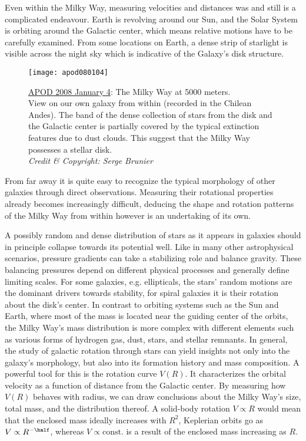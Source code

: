 
Even within the Milky Way, measuring velocities and distances was and still is a
complicated endeavour.  Earth is revolving around our Sun, and the Solar System
is orbiting around the Galactic center, which means relative motions have to be
carefully examined.  From some locations on Earth, a dense strip of starlight is
visible across the night sky which is indicative of the Galaxy's disk structure.

\begin{figure}[h]
    \texttt{[image: apod080104]}
    \caption[The Milky Way: APOD 2008 January
    4]{\href{https://apod.nasa.gov/apod/ap080104.html}{APOD 2008 January 4}: The
    Milky Way at 5000 meters.\\
    View on our own galaxy from within (recorded in the Chilean Andes).  The
    band of the dense collection of stars from the disk and the Galactic center
    is partially covered by the typical extinction features due to dust
    clouds.  This suggest that the Milky Way possesses a stellar disk.\\
    \textit{Credit \& Copyright: Serge Brunier}}
\end{figure}

From far away it is quite easy to recognize the typical morphology of other
galaxies through direct observations.  Measuring their rotational properties already becomes
increasingly difficult, deducing the shape and rotation patterns of the Milky
Way from within however is an undertaking of its own.

A possibly random and dense distribution of stars as it appears in galaxies
should in principle collapse towards its potential well.  Like in many other
astrophysical scenarios, pressure gradients can take a stabilizing role and
balance gravity.  These balancing pressures depend on different physical
processes and generally define limiting scales.  For some galaxies, e.g.
ellipticals, the stars' random motions are the dominant drivers towards
stability, for spiral galaxies it is their rotation about the disk's center.  In
contrast to orbiting systems such as the Sun and Earth, where most of the mass
is located near the guiding center of the orbits, the Milky Way's mass
distribution is more complex with different elements such as various forms of
hydrogen gas, dust, stars, and stellar remnants.  In general, the study of
galactic rotation through stars can yield insights not only into the galaxy's
morphology, but also into its formation history and mass composition.  A
powerful tool for this is the rotation curve $V(R)$.  It characterizes the
orbital velocity as a function of distance from the Galactic center. By
measuring how $V(R)$ behaves with radius, we can draw conclusions about the
Milky Way's size, total mass, and the distribution thereof.  A solid-body
rotation $V \propto R$ would mean that the enclosed mass ideally increases with
$R^{2}$, Keplerian orbits go as $V \propto R^{-\half}$, whereas $V \propto
\text{const.}$ is a result of the enclosed mass increasing as $R$.


